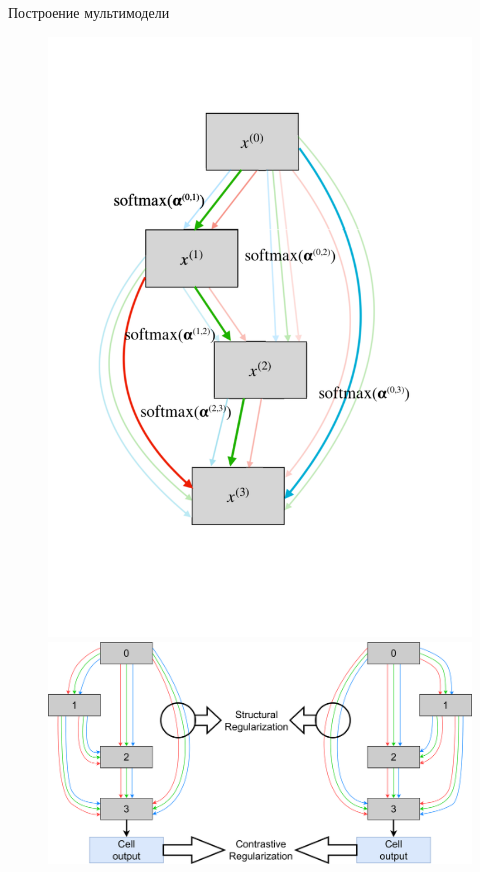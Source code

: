 \documentclass[aspectratio=169]{beamer}
\begin{document}
\begin{frame}{Построение мультимодели}

\begin{figure}
\centering
\begin{minipage}{.4\textwidth}
  \centering
  \includegraphics[width=.9\linewidth]{Graph_no_lambda.pdf}
\end{minipage}%
\begin{minipage}{.6\textwidth}
  \centering
  \includegraphics[width=1.0\linewidth]{multimodel_reg.pdf}
\end{minipage}%
\end{figure}
\end{frame}
\end{document}
